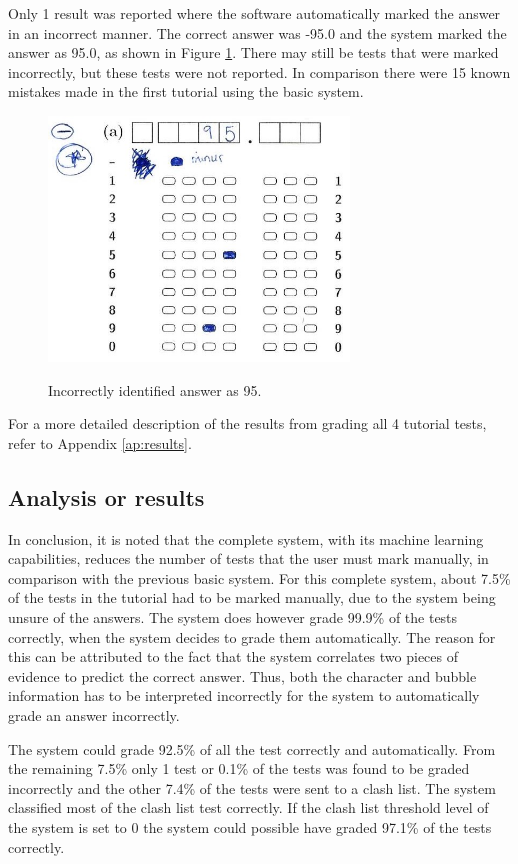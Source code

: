 Only 1 result was reported where the software automatically marked the answer in an incorrect manner. The correct answer was -95.0 and the system marked the answer as 95.0, as shown in Figure \ref{fig:wrongAns}. There may still be tests that were marked incorrectly, but these tests were not reported. In comparison there were 15 known mistakes made in the first tutorial using the basic system.

\begin{figure}
  \centering
  \includegraphics[width=8cm]{wrongResult}\\
  \caption{Incorrectly identified answer as 95.}
  \label{fig:wrongAns}
\end{figure}

For a more detailed description of the results from grading all 4 tutorial tests, refer to Appendix \ref{ap:results}.

\subsection{Analysis or results}

In conclusion, it is noted that the complete system, with its machine learning capabilities, reduces the number of tests that the user must mark manually, in comparison with the previous basic system. For this complete system, about 7.5\% of the tests in the tutorial had to be marked manually, due to the system being unsure of the answers. The system does however grade 99.9\% of the tests correctly, when the system decides to grade them automatically. The reason for this can be attributed to the fact that the system correlates two pieces of evidence to predict the correct answer. Thus, both the character and bubble information has to be interpreted incorrectly for the system to automatically grade an answer incorrectly. 

The system could grade 92.5\% of all the test correctly and automatically. From the remaining 7.5\% only 1 test or 0.1\% of the tests was found to be graded incorrectly and the other 7.4\% of the tests were sent to a clash list. The system classified most of the clash list test correctly. If the clash list threshold level of the system is set to 0 the system could possible have graded 97.1\% of the tests correctly.

